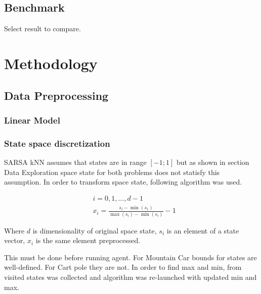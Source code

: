 \documentclass[12pt]{article}
\begin{document}
\subsection{Benchmark}

Select result to compare.

\section{Methodology}
\subsection{Data Preprocessing}
\subsubsection{Linear Model}
\subsubsection{State space discretization}

SARSA kNN assumes that states are in range $[-1;1]$ but as shown in section Data Exploration space state for both problems does not statisfy this assumption. In order to transform space state, following algorithm was used.

\begin{equation}
\begin{aligned}
&i={0,1,\ldots, d-1} \\
&x_i = \frac{s_i - \min(s_1)}{\max(s_i) - \min(s_i)} - 1
\end{aligned}
\end{equation}

Where $d$ is dimensionality of original space state, $s_i$ is an element of a state vector, $x_i$ is the same element preprocessed.

This must be done before running agent. For Mountain Car bounds for states are well-defined. For Cart pole they are not. In order to find max and min, from visited states was collected and algorithm was re-launched with updated min and max.
\end{document}
